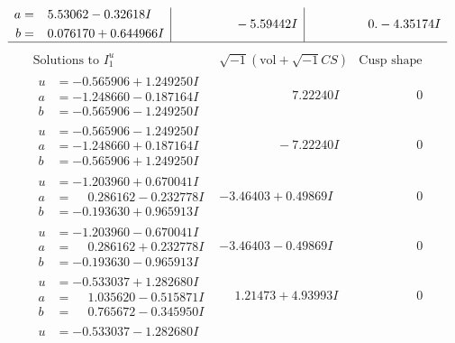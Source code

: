 \documentclass[1p]{elsarticle_modified}
\theoremstyle{definition}
\newcommand{\I}{\sqrt{-1}}
\begin{document}
$$\begin{array}{c|c|c}
\begin{aligned}
a &= \phantom{-}5.53062 - 0.32618 I \\
b &= \phantom{-}0.076170 + 0.644966 I\end{aligned}
 & \phantom{-0.000000 } -5.59442 I & \phantom{-0.000000 } 0. - 4.35174 I\\
 \hline 
 \end{array}$$\newpage$$\begin{array}{c|c|c}  
\text{Solutions to }I^u_{1}& \I (\text{vol} + \sqrt{-1}CS) & \text{Cusp shape}\\
 \hline 
\begin{aligned}
u &= -0.565906 + 1.249250 I \\
a &= -1.248660 - 0.187164 I \\
b &= -0.565906 - 1.249250 I\end{aligned}
 & \phantom{-0.000000 -}7.22240 I & \phantom{-0.000000 } 0 \\ \hline\begin{aligned}
u &= -0.565906 - 1.249250 I \\
a &= -1.248660 + 0.187164 I \\
b &= -0.565906 + 1.249250 I\end{aligned}
 & \phantom{-0.000000 } -7.22240 I & \phantom{-0.000000 } 0 \\ \hline\begin{aligned}
u &= -1.203960 + 0.670041 I \\
a &= \phantom{-}0.286162 - 0.232778 I \\
b &= -0.193630 + 0.965913 I\end{aligned}
 & -3.46403 + 0.49869 I & \phantom{-0.000000 } 0 \\ \hline\begin{aligned}
u &= -1.203960 - 0.670041 I \\
a &= \phantom{-}0.286162 + 0.232778 I \\
b &= -0.193630 - 0.965913 I\end{aligned}
 & -3.46403 - 0.49869 I & \phantom{-0.000000 } 0 \\ \hline\begin{aligned}
u &= -0.533037 + 1.282680 I \\
a &= \phantom{-}1.035620 - 0.515871 I \\
b &= \phantom{-}0.765672 - 0.345950 I\end{aligned}
 & \phantom{-}1.21473 + 4.93993 I & \phantom{-0.000000 } 0 \\ \hline\begin{aligned}
u &= -0.533037 - 1.282680 I \\

\end{aligned}
\end{array}$$
\end{document}
